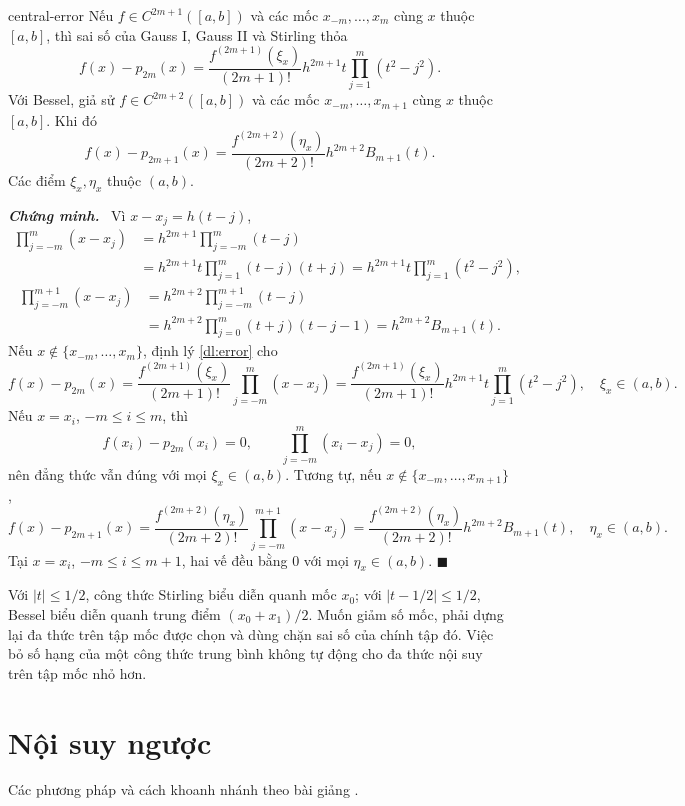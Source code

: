 \documentclass[12pt,a4paper,oneside]{book}
\numberwithin{algorithm}{chapter}
\theoremstyle{definition}
\newenvironment{chungminh}{\par\medskip\noindent\textbf{\textit{\color{mainblue}Chứng minh.}}\ }{\hfill$\blacksquare$\par\medskip}
\begin{document}
\begin{menhde}{}{central-error}
Nếu $f\in C^{2m+1}([a,b])$ và các mốc $x_{-m},\ldots,x_m$ cùng $x$ thuộc $[a,b]$, thì sai số của Gauss I, Gauss II và Stirling thỏa
\[
 f(x)-p_{2m}(x)=\frac{f^{(2m+1)}(\xi_x)}{(2m+1)!}
 h^{2m+1}t\prod_{j=1}^{m}(t^2-j^2).
\]
Với Bessel, giả sử $f\in C^{2m+2}([a,b])$ và các mốc $x_{-m},\ldots,x_{m+1}$ cùng $x$ thuộc $[a,b]$. Khi đó
\[
 f(x)-p_{2m+1}(x)=\frac{f^{(2m+2)}(\eta_x)}{(2m+2)!}
 h^{2m+2}B_{m+1}(t).
\]
Các điểm $\xi_x,\eta_x$ thuộc $(a,b)$.
\end{menhde}
\begin{chungminh}
Vì $x-x_j=h(t-j)$,
\begin{align*}
 \prod_{j=-m}^{m}(x-x_j)
 &=h^{2m+1}\prod_{j=-m}^{m}(t-j)\\
 &=h^{2m+1}t\prod_{j=1}^{m}(t-j)(t+j)
 =h^{2m+1}t\prod_{j=1}^{m}(t^2-j^2),
\end{align*}
\begin{align*}
 \prod_{j=-m}^{m+1}(x-x_j)
 &=h^{2m+2}\prod_{j=-m}^{m+1}(t-j)\\
 &=h^{2m+2}\prod_{j=0}^{m}(t+j)(t-j-1)
 =h^{2m+2}B_{m+1}(t).
\end{align*}
Nếu $x\notin\{x_{-m},\ldots,x_m\}$, định lý \ref{dl:error} cho
\[
 f(x)-p_{2m}(x)
 =\frac{f^{(2m+1)}(\xi_x)}{(2m+1)!}
   \prod_{j=-m}^{m}(x-x_j)
 =\frac{f^{(2m+1)}(\xi_x)}{(2m+1)!}
   h^{2m+1}t\prod_{j=1}^{m}(t^2-j^2),\quad\xi_x\in(a,b).
\]
Nếu $x=x_i$, $-m\leq i\leq m$, thì
\[
 f(x_i)-p_{2m}(x_i)=0,\qquad
 \prod_{j=-m}^{m}(x_i-x_j)=0,
\]
nên đẳng thức vẫn đúng với mọi $\xi_x\in(a,b)$.
Tương tự, nếu $x\notin\{x_{-m},\ldots,x_{m+1}\}$,
\[
 f(x)-p_{2m+1}(x)
 =\frac{f^{(2m+2)}(\eta_x)}{(2m+2)!}
   \prod_{j=-m}^{m+1}(x-x_j)
 =\frac{f^{(2m+2)}(\eta_x)}{(2m+2)!}
   h^{2m+2}B_{m+1}(t),\quad\eta_x\in(a,b).
\]
Tại $x=x_i$, $-m\leq i\leq m+1$, hai vế đều bằng $0$ với mọi $\eta_x\in(a,b)$.
\end{chungminh}
Với $|t|\leq1/2$, công thức Stirling biểu diễn quanh mốc $x_0$; với $|t-1/2|\leq1/2$, Bessel biểu diễn quanh trung điểm $(x_0+x_1)/2$. Muốn giảm số mốc, phải dựng lại đa thức trên tập mốc được chọn và dùng chặn sai số của chính tập đó. Việc bỏ số hạng của một công thức trung bình không tự động cho đa thức nội suy trên tập mốc nhỏ hơn.

\section{Nội suy ngược}
Các phương pháp và cách khoanh nhánh theo bài giảng \cite{inverse-slides}.
\end{document}
